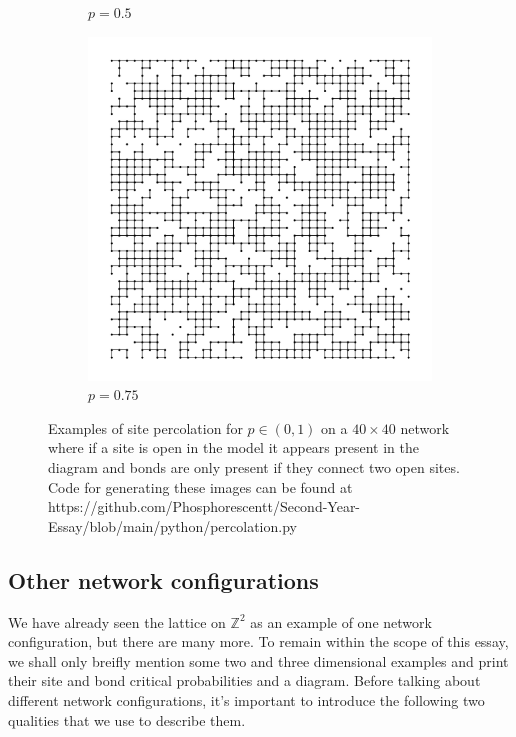 \begin{figure}[p]
\begin{subfigure}[b]{0.45\textwidth}
    \caption{$p=0.5$}
    \label{fig:p=0.5}
  \end{subfigure}
  \hfill
  \begin{subfigure}[b]{0.45\textwidth}
    \centering
    \includegraphics[width=\textwidth]{1/percolation3}
    \caption{$p=0.75$}
    \label{fig:p=0.75}
  \end{subfigure}
  \caption{Examples of site percolation for $p\in(0,1)$ on a $40 \times 40$ network where if a site is open in the model it appears present in the diagram and bonds are only
  present if they connect two open sites. Code for generating these images can be found at https://github.com/Phosphorescentt/Second-Year-Essay/blob/main/python/percolation.py}
  \label{fig:probabilities}
\end{figure}

\subsection{Other network configurations}
We have already seen the lattice on $\mathbb{Z}^2$ as an example of one network configuration, but there are many more. To remain within the scope of this essay, we shall only breifly mention some two and
three dimensional examples and print their site and bond critical probabilities and a diagram. Before talking about different network configurations, it's important to introduce the
following two qualities that we use to describe them.

